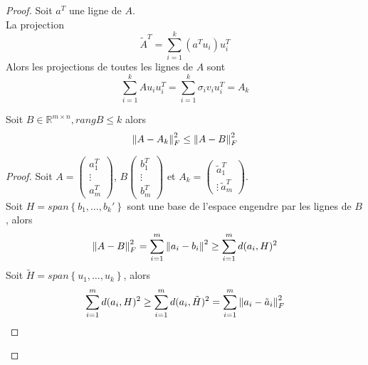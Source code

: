 \documentclass[../main.tex]{subfiles}
\begin{document}
\begin{proof}
Soit $a^{T}$ une ligne de $A$.\\
La projection 
\[ 
\tilde A^{T} = \sum_{i=1}^{ k}( a^{T}u_i ) u_i^{T}
\]
Alors les projections de toutes les lignes de  $A$ sont
\[ 
\sum_{i=1}^{ k}Au_i u_i^{T} = \sum_{i=1}^{ k}\sigma_i v_i u_i ^{T}= A_k		
\]
\begin{thm}
Soit $ B\in \mathbb{R}^{m\times n}, rang B  \leq k$ alors
\[ 
\left\lVert A- A_k\right\rVert _F^{2} \leq  \left\lVert A-B\right\rVert _F^{2}
\]

\end{thm}
\begin{proof}
Soit $A = \begin{pmatrix}
a_1^{T}\\\vdots\\a_m^{T}
\end{pmatrix} $, $B\begin{pmatrix}
b_1^{T}\\\vdots\\b_m^{T}
\end{pmatrix}$ et $A_k = \begin{pmatrix}
\tilde a_1^{T}\\\vdots\ \tilde a_m^{T}
\end{pmatrix} $.\\
Soit $H = span \left\{ b_1,\ldots,b_k' \right\} $ sont une base de l'espace engendre par les lignes de $B$, alors
\[ 
	\left\lVert A-B\right\rVert _F^{2} = \sum_{i=1}^{ m}\left\lVert a_i-b_i\right\rVert ^{2} \geq \sum_{i=1}^{ m}d( a_i,H) ^{2}
\]
Soit $\tilde H = span \left\{ u_1,\ldots,u_k \right\} $, alors
\[ 
	\sum_{i=1}^{ m}d( a_i,H) ^{2} \geq \sum_{i=1}^{ m}d( a_i, \tilde H) ^{2}= \sum_{i=1}^{ m}\left\lVert a_i - \tilde a_i\right\rVert_F ^{2 }
\]


\end{proof}



\end{proof}

	

	
\end{document}
